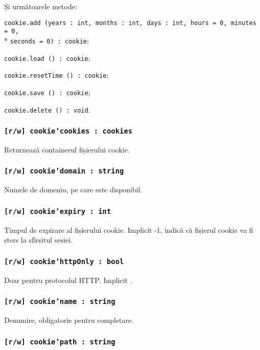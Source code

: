Și următoarele metode:
\begin{icItems}
	\item \texttt{cookie.add (years : int, months : int, days : int, hours = 0, minutes = 0,}\\* \texttt{seconds = 0) : cookie};
	\item \texttt{cookie.load () : cookie};
	\item \texttt{cookie.resetTime () : cookie};
	\item \texttt{cookie.save () : cookie};
	\item \texttt{cookie.delete () : void}.
\end{icItems}

\subsubsection{\texttt{[r/w] cookie'cookies : cookies}}

Returnează containerul fișierului cookie.

\subsubsection{\texttt{[r/w] cookie'domain : string}}

Numele de domeniu, pe care \cookie{} este disponibil.

\subsubsection{\texttt{[r/w] cookie'expiry : int}}

Timpul de expirare al fișierului cookie. Implicit -1, indică că fișierul cookie va fi șters la sfîrșitul sesiei.

\subsubsection{\texttt{[r/w] cookie'httpOnly : bool}}

Doar pentru protocolul HTTP. Implicit \false.

\subsubsection{\texttt{[r/w] cookie'name : string}}

Denumire, obligatorie pentru completare.

\subsubsection{\texttt{[r/w] cookie'path : string}}

